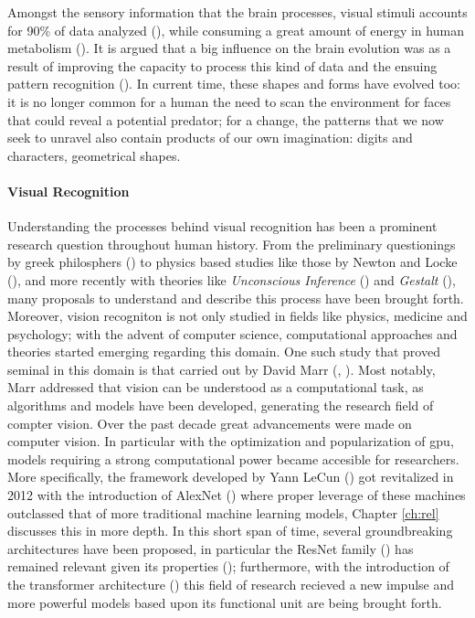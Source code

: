 Amongst the sensory information that the brain processes, visual stimuli accounts 
for 90\% of data analyzed (\cite{potter2014detecting}), while consuming a great amount of energy 
in human metabolism (\cite{phelps1981metabolic}). It is argued that a big influence on the 
brain evolution was as a result of improving the capacity to process this kind of data and the 
ensuing  pattern recognition (\cite{mattson2014superior}). 
In current time, these shapes and forms have evolved too: it is no longer common for a human
the need to scan the environment for faces that could reveal a potential predator; for a change, 
the patterns that we now seek to unravel also contain products of our own imagination: digits and 
characters, geometrical shapes.\\

\paragraph{Visual Recognition} Understanding the processes behind visual recognition has been a 
prominent research question throughout human history. From the preliminary questionings by greek  
philosphers (\cite{finger2001origins}) to physics based studies like those by Newton and Locke 
(\cite{swenson2010optics}), and more recently with theories like \textit{Unconscious Inference} 
(\cite{gullstrand1909hemholtz}) and \textit{Gestalt} (\cite{wagemans2012century}), many proposals 
to understand and describe this process have been brought forth. Moreover, vision recogniton is not 
only studied in fields like physics, medicine and psychology; 
with the advent of computer science, computational approaches and theories started emerging 
regarding this domain. One such study that proved seminal in this domain is that carried out by 
David Marr (\cite{poggio1981marr}, \cite{marr2010vision}). Most notably, Marr addressed that vision 
can be understood as a computational task, as algorithms and models have been 
developed, generating the research field of compter vision.
Over the past decade great advancements were made on computer vision. In particular with the 
optimization and popularization of \gls{gpu}, models requiring a strong computational power became 
accesible for researchers. More specifically, the framework developed by Yann LeCun 
(\cite{lecun1998gradient}) got revitalized in 2012 with the introduction of AlexNet 
(\cite{krizhevsky2012imagenet}) where proper leverage of these machines outclassed that of 
more traditional machine learning models, Chapter \ref{ch:rel} discusses this in more depth. 
In this short span of time, several groundbreaking architectures have been proposed, in 
particular the ResNet family (\cite{he2016deep}) has remained relevant given its properties
(\cite{wightman2021resnet}); furthermore, with the introduction of the transformer architecture 
(\cite{vaswani2017attention}) this field of research recieved a new impulse and more powerful models 
based upon its functional unit are being brought forth.\\

